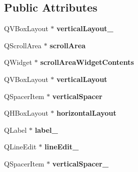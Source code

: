 \subsection*{Public Attributes}
\begin{DoxyCompactItemize}
\item 
Q\+V\+Box\+Layout $\ast$ {\bfseries vertical\+Layout\+\_}\hypertarget{class_ui___add_form_adef0edb81abd12cb024c81aad93896b5}{}\label{class_ui___add_form_adef0edb81abd12cb024c81aad93896b5}

\item 
Q\+Scroll\+Area $\ast$ {\bfseries scroll\+Area}\hypertarget{class_ui___add_form_ab8a12f52544a0525109406a0d8dde8c7}{}\label{class_ui___add_form_ab8a12f52544a0525109406a0d8dde8c7}

\item 
Q\+Widget $\ast$ {\bfseries scroll\+Area\+Widget\+Contents}\hypertarget{class_ui___add_form_aad8852d3c8319383f1acf689515d510d}{}\label{class_ui___add_form_aad8852d3c8319383f1acf689515d510d}

\item 
Q\+V\+Box\+Layout $\ast$ {\bfseries vertical\+Layout}\hypertarget{class_ui___add_form_a2eaa5a8b546d0f6687880a96fb4626a1}{}\label{class_ui___add_form_a2eaa5a8b546d0f6687880a96fb4626a1}

\item 
Q\+Spacer\+Item $\ast$ {\bfseries vertical\+Spacer}\hypertarget{class_ui___add_form_a6fbb169b2ad54a5d2c8010a93c1ff7ab}{}\label{class_ui___add_form_a6fbb169b2ad54a5d2c8010a93c1ff7ab}

\item 
Q\+H\+Box\+Layout $\ast$ {\bfseries horizontal\+Layout}\hypertarget{class_ui___add_form_a4890a306a5d81de99a2824af2f1d1a37}{}\label{class_ui___add_form_a4890a306a5d81de99a2824af2f1d1a37}

\item 
Q\+Label $\ast$ {\bfseries label\+\_}\hypertarget{class_ui___add_form_a9ff3aae9fb1b21100e7276f6b05239b1}{}\label{class_ui___add_form_a9ff3aae9fb1b21100e7276f6b05239b1}

\item 
Q\+Line\+Edit $\ast$ {\bfseries line\+Edit\+\_}\hypertarget{class_ui___add_form_a773b7a4d35a3bb3f8eeb013be96ca70d}{}\label{class_ui___add_form_a773b7a4d35a3bb3f8eeb013be96ca70d}

\item 
Q\+Spacer\+Item $\ast$ {\bfseries vertical\+Spacer\+\_}\hypertarget{class_ui___add_form_afa7929110288562f8d4415938f36c9f9}{}\label{class_ui___add_form_afa7929110288562f8d4415938f36c9f9}


\end{DoxyCompactItemize}
